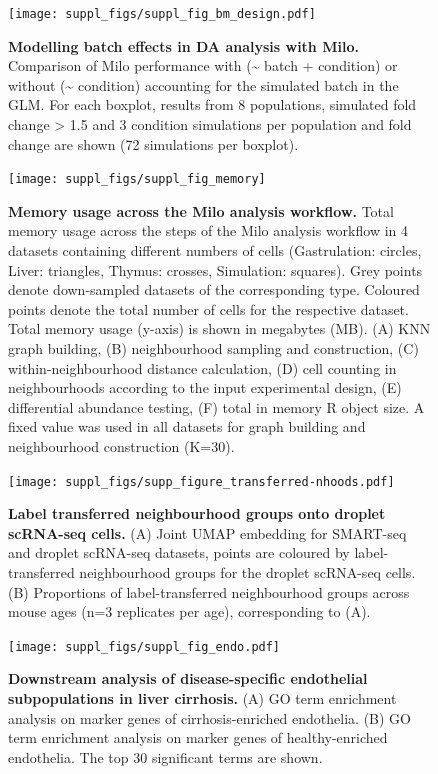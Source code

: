 \documentclass[
]{article}
\begin{document}
\begin{figure}
\centering
\texttt{[image: suppl\_figs/suppl\_fig\_bm\_design.pdf]}
\caption{\label{fig:sup-fig-bm-design}\textbf{Modelling batch effects in DA analysis with Milo.} Comparison of Milo performance with (\textasciitilde{} batch + condition) or without (\textasciitilde{} condition) accounting for the simulated batch in the GLM. For each boxplot, results from 8 populations, simulated fold change \textgreater{} 1.5 and 3 condition simulations per population and fold change are shown (72 simulations per boxplot).}
\end{figure}



\begin{figure}
\texttt{[image: suppl\_figs/suppl\_fig\_memory]} \caption{\textbf{Memory usage across the Milo analysis workflow.}
Total memory usage across the steps of the Milo analysis workflow in 4 datasets containing different numbers of cells (Gastrulation: circles, Liver: triangles, Thymus: crosses, Simulation: squares). Grey points denote down-sampled datasets of the corresponding type. Coloured points denote the total number of cells for the respective dataset. Total memory usage (y-axis) is shown in megabytes (MB). (A) KNN graph building, (B) neighbourhood sampling and construction, (C) within-neighbourhood distance calculation, (D) cell counting in neighbourhoods according to the input experimental design, (E) differential abundance testing, (F) total in memory R object size. A fixed value was used in all datasets for graph building and neighbourhood construction (K=30).}\label{fig:sup-fig-scalability}
\end{figure}




\begin{figure}
\centering
\texttt{[image: suppl\_figs/supp\_figure\_transferred-nhoods.pdf]}
\caption{\label{fig:sup-fig-thymus-nhoods}\textbf{Label transferred neighbourhood groups onto droplet scRNA-seq cells.} (A) Joint UMAP embedding for SMART-seq and droplet scRNA-seq datasets, points are coloured by label-transferred neighbourhood groups for the droplet scRNA-seq cells. (B) Proportions of label-transferred neighbourhood groups across mouse ages (n=3 replicates per age), corresponding to (A).}
\end{figure}



\begin{figure}
\centering
\texttt{[image: suppl\_figs/suppl\_fig\_endo.pdf]}
\caption{\label{fig:sup-fig-liver-endo}\textbf{Downstream analysis of disease-specific endothelial subpopulations in liver cirrhosis.}
(A) GO term enrichment analysis on marker genes of cirrhosis-enriched endothelia. (B) GO term enrichment analysis on marker genes of healthy-enriched endothelia. The top 30 significant terms are shown.}
\end{figure}
\end{document}
